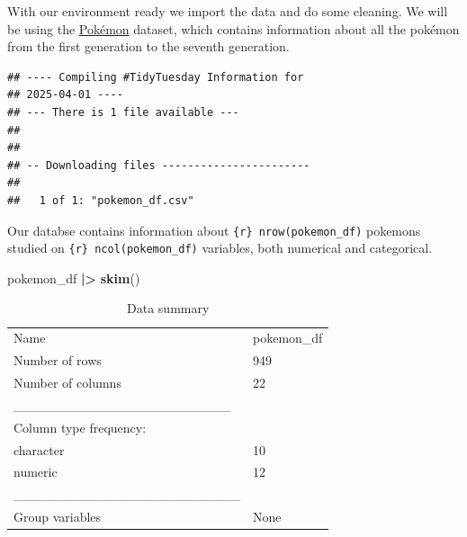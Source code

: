 \documentclass[
]{article}
\newenvironment{Shaded}{\begin{snugshade}}{\end{snugshade}}
\newcommand{\AttributeTok}[1]{\textcolor[rgb]{0.13,0.29,0.53}{#1}}
\newcommand{\CommentTok}[1]{\textcolor[rgb]{0.56,0.35,0.01}{\textit{#1}}}
\newcommand{\DecValTok}[1]{\textcolor[rgb]{0.00,0.00,0.81}{#1}}
\newcommand{\FunctionTok}[1]{\textcolor[rgb]{0.13,0.29,0.53}{\textbf{#1}}}
\newcommand{\NormalTok}[1]{#1}
\newcommand{\OtherTok}[1]{\textcolor[rgb]{0.56,0.35,0.01}{#1}}
\newcommand{\SpecialCharTok}[1]{\textcolor[rgb]{0.81,0.36,0.00}{\textbf{#1}}}
\begin{document}
With our environment ready we import the data and do some cleaning. We
will be using the
\href{https://github.com/rfordatascience/tidytuesday/blob/main/data/2025/2025-04-01/readme.md}{Pokémon}
dataset, which contains information about all the pokémon from the first
generation to the seventh generation.

\begin{Shaded}
\end{Shaded}

\begin{verbatim}
## ---- Compiling #TidyTuesday Information for
## 2025-04-01 ----
## --- There is 1 file available ---
## 
## 
## -- Downloading files -----------------------
## 
##   1 of 1: "pokemon_df.csv"
\end{verbatim}

Our databse contains information about \texttt{\{r\}\ nrow(pokemon\_df)}
pokemons studied on \texttt{\{r\}\ ncol(pokemon\_df)} variables, both
numerical and categorical.

\begin{Shaded}
\begin{Highlighting}[]
\NormalTok{pokemon\_df }\SpecialCharTok{|\textgreater{}} \FunctionTok{skim}\NormalTok{()}
\end{Highlighting}
\end{Shaded}

\begin{longtable}[]{@{}ll@{}}
\caption{Data summary}\tabularnewline
\toprule\noalign{}
\endfirsthead
\endhead
\bottomrule\noalign{}
\endlastfoot
Name & pokemon\_df \\
Number of rows & 949 \\
Number of columns & 22 \\
\_\_\_\_\_\_\_\_\_\_\_\_\_\_\_\_\_\_\_\_\_\_\_ & \\
Column type frequency: & \\
character & 10 \\
numeric & 12 \\
\_\_\_\_\_\_\_\_\_\_\_\_\_\_\_\_\_\_\_\_\_\_\_\_ & \\
Group variables & None \\
\end{longtable}
\end{document}
